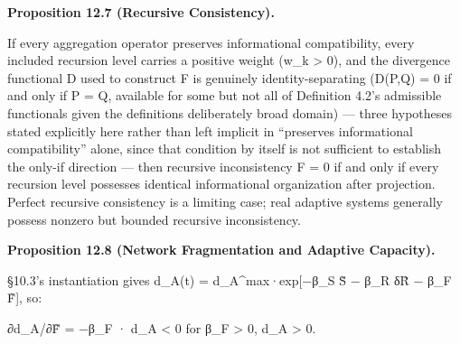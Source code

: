 \documentclass[
]{article}
\begin{document}
\textbf{Proposition 12.7 (Recursive Consistency).}

If every aggregation operator preserves informational compatibility,
every included recursion level carries a positive weight (w\_k
\textgreater{} 0), and the divergence functional D used to construct F
is genuinely identity-separating (D(P,Q) = 0 if and only if P = Q,
available for some but not all of Definition 4.2's admissible
functionals given the definitions deliberately broad domain) --- three
hypotheses stated explicitly here rather than left implicit in
``preserves informational compatibility'' alone, since that condition by
itself is not sufficient to establish the only-if direction --- then
recursive inconsistency F = 0 if and only if every recursion level
possesses identical informational organization after projection. Perfect
recursive consistency is a limiting case; real adaptive systems
generally possess nonzero but bounded recursive inconsistency.

\textbf{Proposition 12.8 (Network Fragmentation and Adaptive Capacity).}

§10.3's instantiation gives d\_A(t) = d\_A\^{}max·exp{[}−β\_S S̃ − β\_R
δR̃ − β\_F F̃{]}, so:

∂d\_A/∂F̃ = −β\_F · d\_A \textless{} 0 for β\_F \textgreater{} 0, d\_A
\textgreater{} 0.
\end{document}
